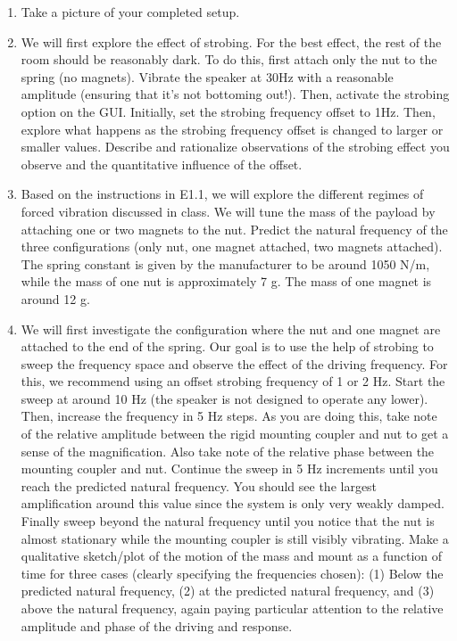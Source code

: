 \documentclass[12pt,letterpaper,english]{article}
\begin{document}
\begin{enumerate}
\item Take a picture of your completed setup.
\item We will first explore the effect of strobing.  For the best effect, the rest of the room should be reasonably dark. To do this, first attach only the nut to the spring (no magnets). Vibrate the speaker at 30Hz with a reasonable amplitude (ensuring that it's not bottoming out!). Then, activate the strobing option on the GUI. Initially, set the strobing frequency offset to 1Hz. Then, explore what happens as the strobing frequency offset is changed to larger or smaller values.  Describe and rationalize observations of the strobing effect you observe and the quantitative influence of the offset.
\item Based on the instructions in E1.1, we will explore the different regimes of forced vibration discussed in class. We will tune the mass of the payload by attaching one or two magnets to the nut. Predict the natural frequency of the three configurations (only nut, one magnet attached, two magnets attached). The spring constant is given by the manufacturer to be around 1050 N/m, while the mass of one nut is approximately 7 g. The mass of one magnet is around 12 g. 
\item We will first investigate the configuration where the nut and one magnet are attached to the end of the spring. Our goal is to use the help of strobing to sweep the frequency space and observe the effect of the driving frequency. For this, we recommend using an offset strobing frequency of 1 or 2 Hz. Start the sweep at around 10 Hz (the speaker is not designed to operate any lower). Then, increase the frequency in 5 Hz steps. As you are doing this, take note of the relative amplitude between the rigid mounting coupler and nut to get a sense of the magnification.  Also take note of the relative phase between the mounting coupler and nut. Continue the sweep in 5 Hz increments until you reach the predicted natural frequency.  You should see the largest amplification around this value since the system is only very weakly damped. Finally sweep beyond the natural frequency until you notice that the nut is almost stationary while the mounting coupler is still visibly vibrating.  Make a qualitative sketch/plot of the motion of the mass and mount as a function of time for three cases (clearly specifying the frequencies chosen): (1) Below the predicted natural frequency, (2) at the predicted natural frequency, and (3) above the natural frequency, again paying particular attention to the relative amplitude and phase of the driving and response.

\end{enumerate}
\end{document}
